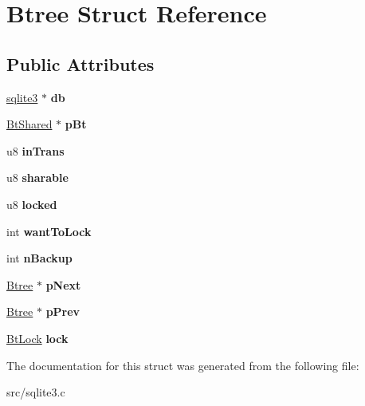 \hypertarget{struct_btree}{\section{Btree Struct Reference}
\label{struct_btree}
}
\subsection*{Public Attributes}
\begin{DoxyCompactItemize}
\item 
\hypertarget{struct_btree_a2b3cfec48b6e9fcfd641d433816ae5c3}{\hyperlink{structsqlite3}{sqlite3} $\ast$ {\bfseries db}}\label{struct_btree_a2b3cfec48b6e9fcfd641d433816ae5c3}

\item 
\hypertarget{struct_btree_a63bab5d744d48d14368af048dddf2f20}{\hyperlink{struct_bt_shared}{Bt\-Shared} $\ast$ {\bfseries p\-Bt}}\label{struct_btree_a63bab5d744d48d14368af048dddf2f20}

\item 
\hypertarget{struct_btree_a50007448960c05dfd1fdc7db3e277685}{u8 {\bfseries in\-Trans}}\label{struct_btree_a50007448960c05dfd1fdc7db3e277685}

\item 
\hypertarget{struct_btree_a114f157127c76a1fbad8292e4b39c4dd}{u8 {\bfseries sharable}}\label{struct_btree_a114f157127c76a1fbad8292e4b39c4dd}

\item 
\hypertarget{struct_btree_a16fc8292bae9a66cfec03f6cb82d06a8}{u8 {\bfseries locked}}\label{struct_btree_a16fc8292bae9a66cfec03f6cb82d06a8}

\item 
\hypertarget{struct_btree_a97368ea300f0b74b8e80ea07da0cea2a}{int {\bfseries want\-To\-Lock}}\label{struct_btree_a97368ea300f0b74b8e80ea07da0cea2a}

\item 
\hypertarget{struct_btree_a7a3e7cf38bc9c3021a9e270a54ecfb1e}{int {\bfseries n\-Backup}}\label{struct_btree_a7a3e7cf38bc9c3021a9e270a54ecfb1e}

\item 
\hypertarget{struct_btree_a9e6d2ca44c10ed8ef0be004225a74ef5}{\hyperlink{struct_btree}{Btree} $\ast$ {\bfseries p\-Next}}\label{struct_btree_a9e6d2ca44c10ed8ef0be004225a74ef5}

\item 
\hypertarget{struct_btree_a0423f1c55c1fe6812161a49bb2bf604f}{\hyperlink{struct_btree}{Btree} $\ast$ {\bfseries p\-Prev}}\label{struct_btree_a0423f1c55c1fe6812161a49bb2bf604f}

\item 
\hypertarget{struct_btree_a943ed8799c9943f753a88cf44f1632dc}{\hyperlink{struct_bt_lock}{Bt\-Lock} {\bfseries lock}}\label{struct_btree_a943ed8799c9943f753a88cf44f1632dc}

\end{DoxyCompactItemize}


The documentation for this struct was generated from the following file\-:\begin{DoxyCompactItemize}
\item 
src/sqlite3.\-c\end{DoxyCompactItemize}
